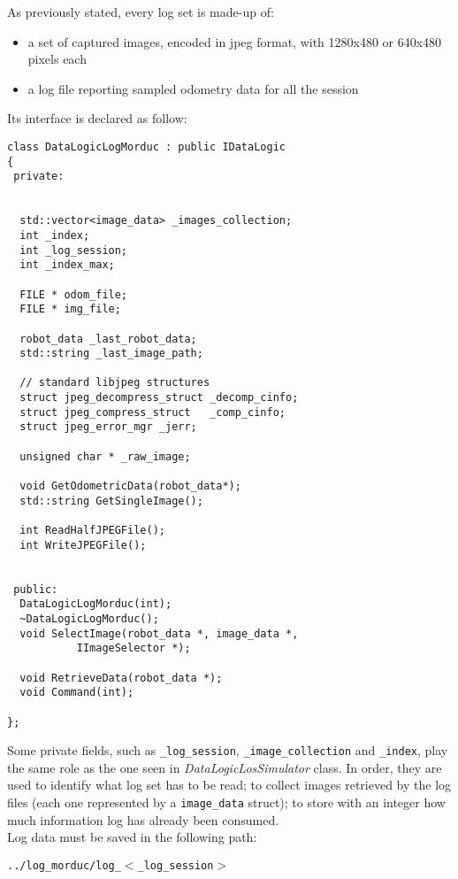 As previously stated, every log set is made-up of:

\begin{itemize}
  \item a set of captured images, encoded in jpeg format,
    with 1280x480 or 640x480 pixels each
  \item a log file reporting sampled odometry data
    for all the session
\end{itemize}

Its interface is declared as follow:

\begin{lstlisting}[caption={\texttt{DataLogicLogMorduc} declaration},
    label={code:datalogiclogmorduc:constructor}, frame=trBL]
class DataLogicLogMorduc : public IDataLogic
{
 private:

  
  std::vector<image_data> _images_collection;
  int _index;
  int _log_session;
  int _index_max;

  FILE * odom_file;
  FILE * img_file;

  robot_data _last_robot_data;
  std::string _last_image_path;

  // standard libjpeg structures
  struct jpeg_decompress_struct _decomp_cinfo;
  struct jpeg_compress_struct   _comp_cinfo;
  struct jpeg_error_mgr _jerr;

  unsigned char * _raw_image;
 
  void GetOdometricData(robot_data*);
  std::string GetSingleImage();

  int ReadHalfJPEGFile();
  int WriteJPEGFile();

  
 public:
  DataLogicLogMorduc(int);
  ~DataLogicLogMorduc();
  void SelectImage(robot_data *, image_data *,
		   IImageSelector *);

  void RetrieveData(robot_data *);
  void Command(int);

};
\end{lstlisting}

Some private fields, such as
\texttt{\_log\_session}, \texttt{\_image\_collection}
and \texttt{\_index}, play
the same role as the one seen in \textit{DataLogicLosSimulator}
class. In order, they are used to identify what log set has
to be read; to collect images retrieved by the log files (each
one represented by a \texttt{image\_data} struct);
to store with an integer how much information log has already
been consumed.
\\
Log data must be saved in the following path:

\begin{center}
  \texttt{../log\_morduc/log\_$<$\_log\_session$>$}
\end{center}


